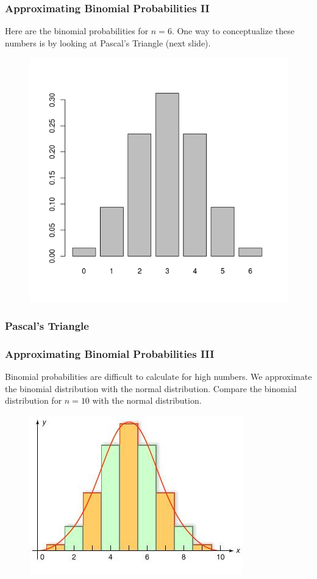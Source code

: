 \documentclass[xcolor=dvipsnames]{beamer}
\begin{document}
\begin{frame}
  \frametitle{Approximating Binomial Probabilities II}
Here are the binomial probabilities for $n=6$. One way to
conceptualize these numbers is by looking at Pascal's Triangle (next
slide). 
  \begin{figure}[h]
    \includegraphics[scale=.5]{./binomial1.png}
  \end{figure}
\end{frame}

\begin{frame}
  \frametitle{Pascal's Triangle}
\end{frame}

\begin{frame}
  \frametitle{Approximating Binomial Probabilities III}
Binomial probabilities are difficult to calculate for high numbers. We
approximate the binomial distribution with the \alert{normal distribution}.
Compare the binomial distribution for $n=10$ with the normal
distribution.
  \begin{figure}[h]
    \includegraphics[scale=.5]{./binnorm1_ed.jpg}
  \end{figure}
\end{frame}
\end{document}
